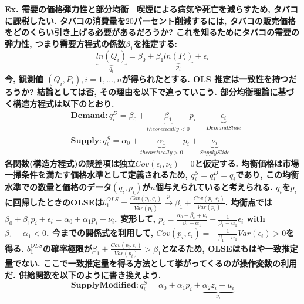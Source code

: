 \documentclass[paper=a4paper,fontsize=10pt]{jlreq}
\begin{document}
\rmfamily\mcfamily\bfseries{Ex. 需要の価格弾力性と部分均衡}\mdseries　喫煙による病気や死亡を減らすため, タバコに課税したい. タバコの消費量を$20$パーセント削減するには, タバコの販売価格をどのくらい引き上げる必要があるだろうか? これを知るためにタバコの需要の弾力性, つまり\rmfamily\mcfamily\bfseries{需要方程式}\mdseries の係数$\beta_1$を推定する:
\begin{equation*}
  \underset{q_i}{\underbrace{ln(Q_i)}} = \beta_0 + \beta_1 \underset{p_i}{\underbrace{ln(P_i)}} + \epsilon_i
\end{equation*}
今, 観測値 $(Q_i, P_i), i = 1,\dots,n$が得られたとする. OLS 推定は一致性を持つだろうか? 結論としては否, その理由を以下で追っていこう. 部分均衡理論に基づく構造方程式は以下のとおり.
\begin{align*}
  &\mathbf{Demand}:　q_i^D = \beta_0 + \underset{theoretically <0}{\underbrace{\beta_1}} p_i + \underset{Demand Slide}{\underbrace{\epsilon_i}}\\
  &\mathbf{Supply}:　　q_i^S = \alpha_0 + \underset{theoretically >0}{\underbrace{\alpha_1}} p_i + \underset{Supply Slide}{\underbrace{\nu_i}}
\end{align*}
各関数(構造方程式)の誤差項は独立$Cov(\epsilon_i, \nu_i)=0$と仮定する. 均衡価格は市場一掃条件を満たす価格水準として定義されるため, $q_i^S=q_i^D=q_i$であり, この均衡水準での数量と価格のデータ$(q_i, p_i)$が$n$個与えられていると考えられる. $q_i$を$p_i$に回帰したときのOLSEは$b_1^{OLS}=\frac{\hat{Cov}(p_i, q_i)}{\hat{Var}(p_i)} \overset{p}{\to} \beta_1 + \frac{{Cov}(p_i, \epsilon_i)}{{Var}(p_i)}$. 均衡点では$\beta_0 + \beta_1 p_i + \epsilon_i = \alpha_0 + \alpha_1 p_i + \nu_i$. 変形して, $p_i = \frac{\alpha_0 - \beta_0 + \nu_i}{\beta_1 - \alpha_1} - \frac{1}{\beta_1 - \alpha_1}\epsilon_i$ with $\beta_1 - \alpha_1 <0$. 今までの関係式を利用して, $Cov(p_i, \epsilon_i) = -\frac{1}{\beta_1 - \alpha_1}Var(\epsilon_i) > 0$を得る. $b_1^{OLS}$の確率極限が$\beta_1 + \frac{{Cov}(p_i, \epsilon_i)}{{Var}(p_i)} > \beta_1$となるため, OLSEは\rmfamily\mcfamily\bfseries{もはや一致推定量でない}\mdseries . ここで一致推定量を得る方法として挙がってくるのが\rmfamily\mcfamily\bfseries{操作変数}\mdseries の利用だ. 供給関数を以下のように書き換えよう.
\begin{equation*}
  \mathbf{SupplyModified}:　　q_i^S = \alpha_0 + \alpha_1 p_i + \underset{\nu_i}{\underbrace{\alpha_2 z_i + u_i}}
\end{equation*}
\end{document}
